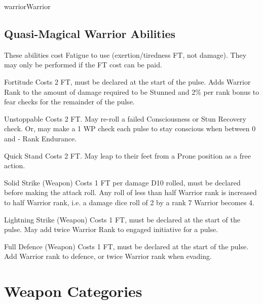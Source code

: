 \begin{Skill}[3.0]{warrior}{Warrior}
\begin{Description}
\end{Description}

\subsection{Quasi-Magical Warrior Abilities}

These abilities cost Fatigue to use (exertion/tiredness FT, not
damage).  They may only be performed if the FT cost can be paid.

\begin{Description}

\item[Fortitude] Costs 2 FT, must be declared at the start of the
  pulse.  Adds Warrior Rank to the amount of damage required to be
  Stunned and 2\% per rank bonus to fear checks for the remainder of
  the pulse.

\item[Unstoppable] Costs 2 FT.  May re-roll a failed Consciousness or
  Stun Recovery check.  Or, may make a 1 \x WP check each pulse to
  stay conscious when between 0 and - Rank Endurance.

\item[Quick Stand] Costs 2 FT.  May leap to their feet from a Prone
  position as a free action.

\item[Solid Strike (Weapon)] Costs 1 FT per damage D10 rolled, must be
  declared before making the attack roll.  Any roll of less than half
  Warrior rank is increased to half Warrior rank, i.e. a damage dice
  roll of 2 by a rank 7 Warrior becomes 4.

\item[Lightning Strike (Weapon)] Costs 1 FT, must be declared at the
  start of the pulse.  May add twice Warrior Rank to engaged
  initiative for a pulse.

\item[Full Defence (Weapon)] Costs 1 FT, must be declared at the start
  of the pulse. Add Warrior rank to defence, or twice Warrior rank
  when evading.

\end{Description}

\begin{table*}
\section{Weapon Categories}

\medskip


\end{table*}
\end{Skill}
